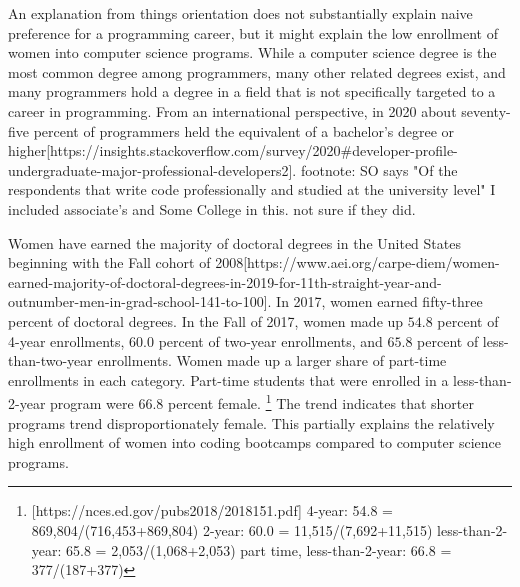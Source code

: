 \documentclass[review]{elsarticle}
\begin{document}
An explanation from things orientation does not substantially explain
naive preference for a programming career,
but it might explain the low enrollment of women into computer science programs.
While a computer science degree is the most common degree among programmers,
many other related degrees exist,
and many programmers hold a degree in a field that is not specifically targeted to a career in programming.
From an international perspective,
in 2020 about seventy-five percent of programmers held the equivalent of a bachelor's degree or higher[https://insights.stackoverflow.com/survey/2020#developer-profile-undergraduate-major-professional-developers2].
footnote: SO says "Of the respondents that write code professionally and studied at the university level"
I included associate's and Some College in this. not sure if they did.



Women have earned the majority of doctoral degrees in the United States
beginning with the Fall cohort of 2008[https://www.aei.org/carpe-diem/women-earned-majority-of-doctoral-degrees-in-2019-for-11th-straight-year-and-outnumber-men-in-grad-school-141-to-100].
In 2017, women earned fifty-three percent of doctoral degrees.
In the Fall of 2017, women made up $54.8$ percent of 4-year enrollments,
$60.0$ percent of two-year enrollments,
and $65.8$ percent of less-than-two-year enrollments.
Women made up a larger share of part-time enrollments in each category.
Part-time students that were enrolled in a less-than-2-year program
were $66.8$ percent female.
\footnote{
    [https://nces.ed.gov/pubs2018/2018151.pdf]
    4-year: 54.8 = 869,804/(716,453+869,804)
    2-year: 60.0 = 11,515/(7,692+11,515)
    less-than-2-year: 65.8 = 2,053/(1,068+2,053)
    part time, less-than-2-year: 66.8 = 377/(187+377)
}
The trend indicates that shorter programs trend disproportionately female.
This partially explains the relatively high enrollment of women into
coding bootcamps compared to computer science programs.

\end{document}
